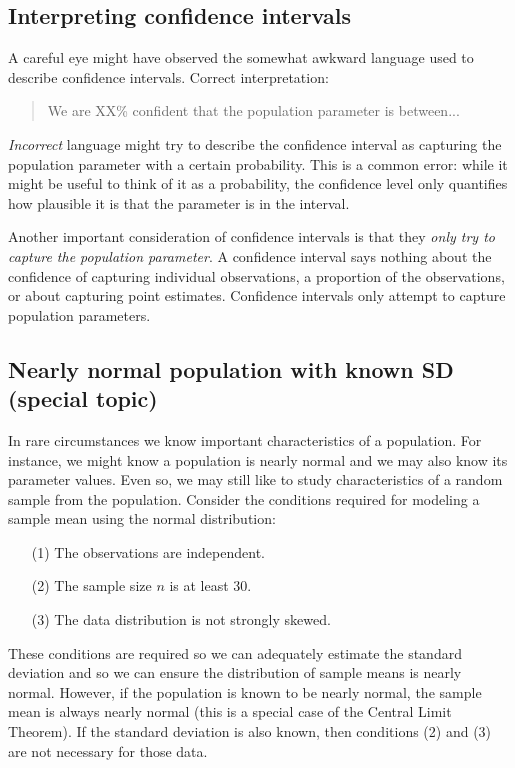 \subsection{Interpreting confidence intervals}
\label{interpretingCIs}


A careful eye might have observed the somewhat awkward language used to describe confidence intervals. Correct interpretation:
\begin{quote}
We are XX\% confident that the population parameter is between...
\end{quote}
\emph{Incorrect} language might try to describe the confidence interval as capturing the population parameter with a certain probability. This is a common error: while it might be useful to think of it as a probability, the confidence level only quantifies how plausible it is that the parameter is in the interval.

Another important consideration of confidence intervals is that they \emph{only try to capture the population parameter}. A confidence interval says nothing about the confidence of capturing individual observations, a proportion of the observations, or about capturing point estimates. Confidence intervals only attempt to capture population parameters.


\subsection[Nearly normal population with known SD (special topic)]{Nearly normal population with known SD (special topic)}
\label{nearlyNormalPopWithKnownSD}



In rare circumstances we know important characteristics of a population. For instance, we might know a population is nearly normal and we may also know its parameter values. Even so, we may still like to study characteristics of a random sample from the population. Consider the conditions required for modeling a sample mean using the normal distribution:
\begin{enumerate}
\setlength{\itemsep}{0mm}
\item[(1)] The observations are independent.
\item[(2)] The sample size $n$ is at least 30.
\item[(3)] The data distribution is not strongly skewed.
\end{enumerate}
These conditions are required so we can adequately estimate the standard deviation and so we can ensure the distribution of sample means is nearly normal. However, if the population is known to be nearly normal, the sample mean is always nearly normal (this is a special case of the Central Limit Theorem). If the standard deviation is also known, then conditions (2) and (3) are not necessary for those data.

